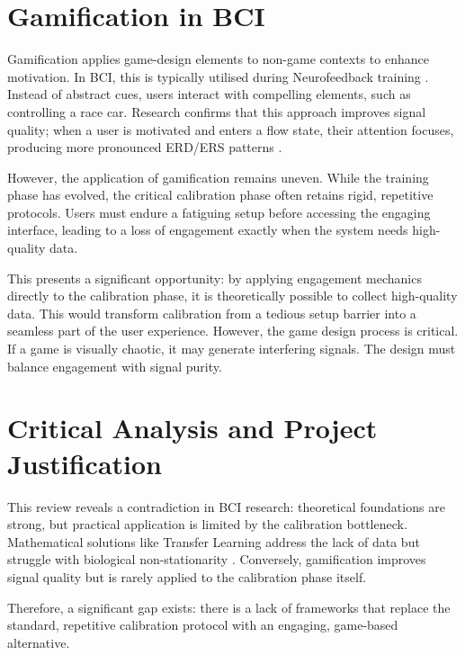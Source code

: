 \documentclass[a4paper, 11pt, openany]{report}
\let\cite\citep
\begin{document}
    \section{Gamification in BCI}
    Gamification applies game-design elements to non-game contexts to enhance 
    motivation. In BCI, this is typically utilised during Neurofeedback training \cite{Skola2019}. 
    Instead of abstract cues, users interact with compelling elements, such as 
    controlling a race car. Research confirms that this approach improves signal 
    quality; when a user is motivated and enters a flow state, their attention 
    focuses, producing more pronounced ERD/ERS patterns \cite{Atilla2024}.

    However, the application of gamification remains uneven. While the training
    phase has evolved, the critical calibration phase often retains rigid, 
    repetitive protocols. Users must endure a fatiguing setup before accessing the 
    engaging interface, leading to a loss of engagement exactly when the system 
    needs high-quality data.

    This presents a significant opportunity: by applying engagement mechanics 
    directly to the calibration phase, it is theoretically possible to collect 
    high-quality data. This would transform calibration from a 
    tedious setup barrier into a seamless part of the user experience. However, 
    the game design process is critical. If a game is visually chaotic, it may 
    generate interfering signals. The design must balance engagement with signal purity.


    \section{Critical Analysis and Project Justification}
    This review reveals a contradiction in BCI research: theoretical foundations 
    are strong, but practical application is limited by the calibration bottleneck. 
    Mathematical solutions like Transfer Learning address the lack of data but
    struggle with biological non-stationarity \cite{Sugiyama2008}. Conversely, 
    gamification improves signal quality but is rarely applied to the calibration 
    phase itself.

    Therefore, a significant gap exists: there is a lack of frameworks 
    that replace the standard, repetitive calibration protocol with an engaging, 
    game-based alternative.
\end{document}
